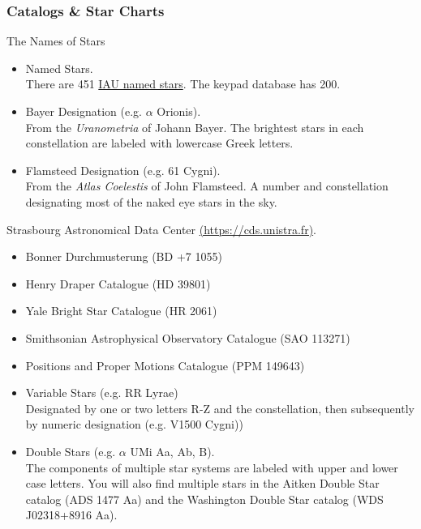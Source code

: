 \subsubsection{Catalogs \& Star Charts}
\begin{frame}{The Names of Stars}
  \Large
  \begin{itemize}
    \item Named Stars. \\
    There are 451 \href{https://www.iau.org/public/themes/naming_stars/}{IAU named stars}.
    The keypad database has 200.
    \item Bayer Designation (e.g. $\alpha$ Orionis).\\
    From the \emph{Uranometria} of Johann Bayer. The brightest stars in each constellation are labeled with
    lowercase Greek letters.
    \item Flamsteed Designation (e.g. 61 Cygni).\\
    From the \emph{Atlas Coelestis} of John Flamsteed. A number and constellation designating most of the
    naked eye stars in the sky.
  \end{itemize}
\end{frame}


\begin{frame}{\insertsubsubsectionhead}
  \Large
  Strasbourg Astronomical Data Center \href{https://cds.unistra.fr/}{(https://cds.unistra.fr)}.
  \begin{itemize}
    \item Bonner Durchmusterung (BD +7 1055)
    \item Henry Draper Catalogue (HD 39801)
    \item Yale Bright Star Catalogue (HR 2061)
    \item Smithsonian Astrophysical Observatory Catalogue (SAO 113271)
    \item Positions and Proper Motions Catalogue (PPM 149643)
  \end{itemize}
\end{frame}


\begin{frame}{\insertsubsubsectionhead}
  \Large
  \begin{itemize}
    \item Variable Stars (e.g. RR Lyrae)\\
    Designated by one or two letters R-Z and the constellation, then subsequently
    by numeric designation (e.g. V1500 Cygni))
    \item Double Stars (e.g. $\alpha$ UMi Aa, Ab, B).\\
    The components of multiple star systems are labeled with upper and lower case letters.
    You will also find multiple stars in the Aitken Double Star catalog (ADS 1477 Aa) and
    the Washington Double Star catalog (WDS J02318+8916 Aa).
  \end{itemize}
\end{frame}

